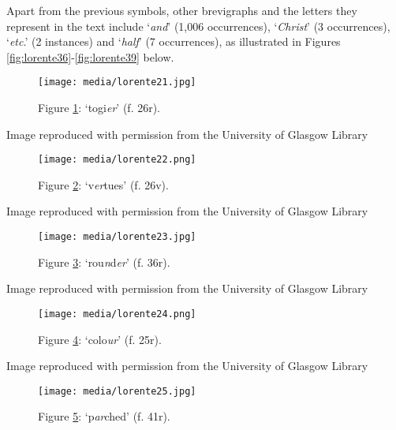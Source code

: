\documentclass{article}
\begin{document}
Apart from the previous symbols, other brevigraphs and the letters they
represent in the text include `\emph{and}' (1,006 occurrences),
`\emph{Christ}' (3 occurrences), `\emph{etc}.' (2 instances) and
`\emph{half}' (7 occurrences), as illustrated in Figures \ref{fig:lorente36}-\ref{fig:lorente39} below.

\begin{figure}[H]
  \centering
    \texttt{[image: media/lorente21.jpg]}
    \caption{Figure \ref{fig:lorente21}: `togi\th\emph{er}' (f. 26r).}
    \label{fig:lorente21}
  \end{figure}


 Image reproduced with permission from the University of Glasgow Library 


 
  \begin{figure}
    \texttt{[image: media/lorente22.png]}
    \caption{Figure \ref{fig:lorente22}: `v\emph{er}tues' (f.
26v).}
    \label{fig:lorente22}
\end{figure}


 Image reproduced with permission from the University of Glasgow Library 


 
\begin{figure}[H]
  \centering
    \texttt{[image: media/lorente23.jpg]}
    \caption{Figure \ref{fig:lorente23}: `rou\emph{n}d\emph{er}' (f. 36r).}
    \label{fig:lorente23}
  \end{figure}


 Image reproduced with permission from the University of Glasgow Library 


 
  \begin{figure}
    \texttt{[image: media/lorente24.png]}
    \caption{Figure \ref{fig:lorente24}: `colo\emph{ur}' (f. 25r).}
    \label{fig:lorente24}
\end{figure}


 Image reproduced with permission from the University of Glasgow Library 


 
\begin{figure}[H]
  \centering
    \texttt{[image: media/lorente25.jpg]}
    \caption{Figure \ref{fig:lorente25}: `p\emph{ar}ched' (f. 41r).\\}
    \label{fig:lorente25}
  \end{figure}
\end{document}
